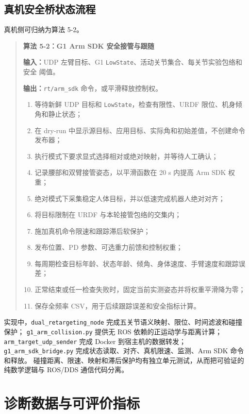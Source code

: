 \subsection{真机安全桥状态流程}
\label{subsec:ch5_real_bridge_algorithm}

真机侧可归纳为算法 5-2。

\begin{quote}
\textbf{算法 5-2：G1 Arm SDK 安全接管与跟随}

\textbf{输入：}UDP 左臂目标、G1 \texttt{LowState}、活动关节集合、每关节实验包络和安全
阈值。

\textbf{输出：}\texttt{rt/arm\_sdk} 命令，或平滑释放控制权。

\begin{enumerate}[label=\arabic*.]
  \item 等待新鲜 UDP 目标和 \texttt{LowState}，检查有限性、URDF 限位、机身倾角和静止状态；
  \item 在 dry-run 中显示源目标、应用目标、实际角和初始差值，不创建命令发布器；
  \item 执行模式下要求显式选择相对或绝对映射，并等待人工确认；
  \item 记录腰部和双臂接管姿态，以平滑函数在 20 s 内提高 Arm SDK 权重；
  \item 绝对模式下采集稳定人体目标，并以低速完成机器人绝对对齐；
  \item 将目标限制在 URDF 与本轮接管包络的交集内；
  \item 施加真机命令限速和跟踪滞后软保护；
  \item 发布位置、PD 参数、可选重力前馈和控制权重；
  \item 每周期检查目标年龄、状态年龄、倾角、身体速度、手臂速度和跟踪误差；
  \item 正常结束或任一检查失败时，固定当前实测姿态并将权重平滑降为零；
  \item 保存全频率 CSV，用于后续跟踪误差和安全指标计算。
\end{enumerate}
\end{quote}

实现中，\texttt{dual\_retargeting\_node} 完成五关节语义映射、限位、时间滤波和碰撞保护；
\texttt{g1\_arm\_collision.py} 提供无 ROS 依赖的正运动学与距离计算；
\texttt{arm\_target\_udp\_sender} 完成 Docker 到宿主机的数据转发；
\texttt{g1\_arm\_sdk\_bridge.py} 完成状态读取、对齐、真机限速、监测、Arm SDK 命令和释放。
碰撞距离、限速、映射和滞后保护均有独立单元测试，从而把可验证的纯数学逻辑与 ROS/DDS
通信代码分离。

\section{诊断数据与可评价指标}
\label{sec:ch5_diagnostics_metrics}

